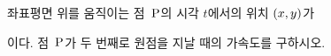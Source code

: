 좌표평면 위를 움직이는 점~$\mathrm{P}$의 시각 $t$에서의 위치 $(x{,}\mkern3mu\mathopen{}y)$가 \par\smallskip{}\par\smallskip\noindent 이다. 점~$\mathrm{P}$가 두 번째로 원점을 지날 때의 가속도를 구하시오.
